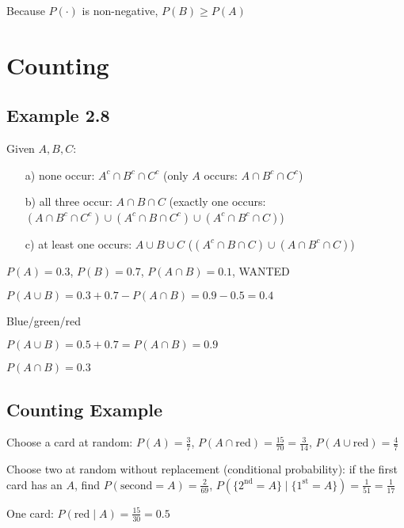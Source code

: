 Because $P(\cdot)$ is non-negative, $P(B) \geq P(A)$

\section{Counting}

\subsection{Example 2.8}
Given $A, B, C$:
\begin{enumerate}
\item[a)] none occur: $A^c \cap B^c \cap C^c$ (only $A$ occurs: $A \cap B^c \cap C^c$)
\item[b)] all three occur: $A \cap B \cap C$ (exactly one occurs: $(A \cap B^c \cap C^c) \cup (A^c \cap B \cap C^c) \cup (A^c \cap B^c \cap C)$)
\item[c)] at least one occurs: $A \cup B \cup C$ ($(A^c \cap B \cap C) \cup (A \cap B^c \cap C)$)
\end{enumerate}

$P(A) = 0.3$, $P(B) = 0.7$, $P(A \cap B) = 0.1$, WANTED

$P(A \cup B) = 0.3 + 0.7 - P(A \cap B) = 0.9 - 0.5 = 0.4$

Blue/green/red

$P(A \cup B) = 0.5 + 0.7 = P(A \cap B) = 0.9$

$P(A \cap B) = 0.3$

\begin{center}
\end{center}

\subsection{Counting Example}
Choose a card at random: $P(A) = \frac{3}{7}$, $P(A \cap \text{red}) = \frac{15}{70} = \frac{3}{14}$, $P(A \cup \text{red}) = \frac{4}{7}$

Choose two at random without replacement (conditional probability): if the first card has an $A$, find $P(\text{second} = A) = \frac{2}{69}$, $P(\{2^{\text{nd}} = A\} \mid \{1^{\text{st}} = A\}) = \frac{1}{51} = \frac{1}{17}$

One card: $P(\text{red} \mid A) = \frac{15}{30} = 0.5$

